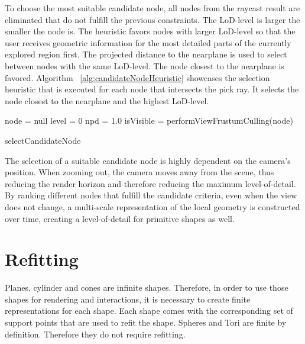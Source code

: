 To choose the most suitable candidate node, all nodes from the raycast result are eliminated that do not fulfill the previous constraints. The LoD-level is larger the smaller the node is. The heuristic favors nodes with larger LoD-level so that the user receives geometric information for the most detailed parts of the currently explored region first. The projected distance to the nearplane is used to select between nodes with the same LoD-level. The node closest to the nearplane is favored. Algorithm ~\ref{alg:candidateNodeHeuristic} showcases the selection heuristic that is executed for each node that intersects the pick ray. It selects the node closest to the nearplane and the highest LoD-level.

\begin{algorithm}
	
	node 	= null\;
	level = 0\;
	npd 	= 1.0\;
	{
		isVisible = performViewFrustumCulling(node)\;
	}
\caption{selectCandidateNode}
\label{alg:candidateNodeHeuristic}
\end{algorithm}

The selection of a suitable candidate node is highly dependent on the camera's position. When zooming out, the camera moves away from the scene, thus reducing the render horizon and therefore reducing the maximum level-of-detail. By ranking different nodes that fulfill the candidate criteria, even when the view does not change, a multi-scale representation of the local geometry is constructed over time, creating a level-of-detail for primitive shapes as well. 


\section{Refitting}
\label{sec:Refitting}
Planes, cylinder and cones are infinite shapes. Therefore, in order to use those shapes for rendering and interactions, it is necessary to create finite representations for each shape. Each shape comes with the corresponding set of support points that are used to refit the shape. Spheres and Tori are finite by definition. Therefore they do not require refitting. 

